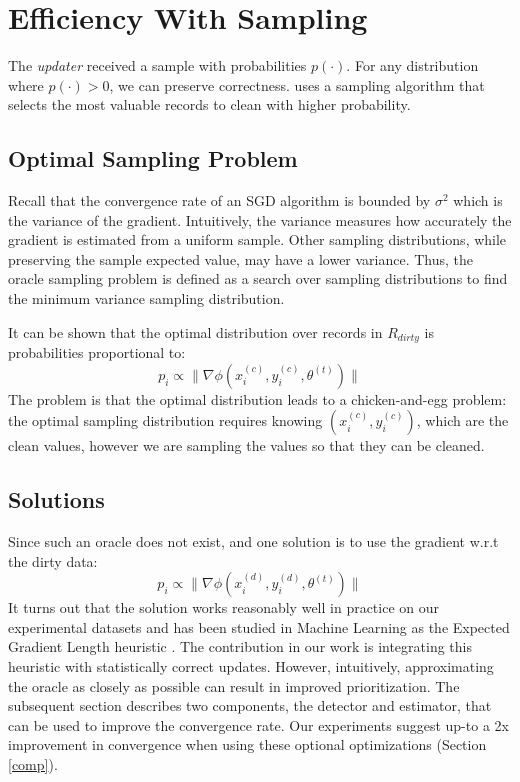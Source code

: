 \section{Efficiency With Sampling}\label{dist-samp}
The \emph{updater} received a sample with probabilities $p(\cdot)$.
For any distribution where  $p(\cdot) > 0$, we can preserve correctness.
\sys uses a sampling algorithm that selects the most valuable records to clean with higher probability. 

\subsection{Optimal Sampling Problem}
Recall that the convergence rate of an SGD algorithm is bounded by $\sigma^2$ which is the variance of the gradient.
Intuitively, the variance measures how accurately the gradient is estimated from a uniform sample.
Other sampling distributions, while preserving the sample expected value, may have a lower variance.
Thus, the oracle sampling problem is defined as a search over sampling distributions to find the minimum variance sampling distribution.

It can be shown that the optimal distribution over records in $R_{dirty}$ is probabilities proportional to:
\[
p_i \propto \|\nabla\phi(x^{(c)}_i,y^{(c)}_i,\theta^{(t)})\|
\]
The problem is that the optimal distribution leads to a chicken-and-egg problem:
the optimal sampling distribution requires knowing $(x^{(c)}_i,y^{(c)}_i)$, which are the clean values, however we are sampling the values so that they can be cleaned.

\subsection{Solutions}\label{dgsample}
Since such an oracle does not exist, and one solution is to use the gradient w.r.t the dirty data:
\[
p_i \propto \|\nabla\phi(x^{(d)}_i,y^{(d)}_i,\theta^{(t)})\|
\]
It turns out that the solution works reasonably well in practice on our experimental datasets and has been studied in Machine Learning as the Expected Gradient Length heuristic \cite{settles2010active}.
The contribution in our work is integrating this heuristic with statistically correct updates.
However, intuitively, approximating the oracle as closely as possible can result in improved prioritization.
The subsequent section describes two components, the detector and estimator, that can be used to improve the convergence rate.
Our experiments suggest up-to a 2x improvement in convergence when using these optional optimizations (Section \ref{comp}).